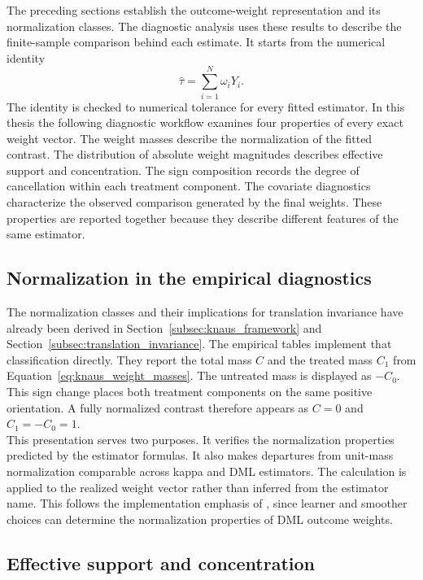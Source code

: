 \documentclass[12pt, a4paper, oneside]{article}
\theoremstyle{plain}
\theoremstyle{definition}
\begin{document}
The preceding sections establish the outcome-weight representation and its
normalization classes. The diagnostic analysis uses these results to describe the
finite-sample comparison behind each estimate. It starts from the numerical identity
\begin{equation}
    \widehat\tau=\sum_{i=1}^{N}\omega_iY_i.
    \label{eq:diagnostic_identity}
\end{equation}
The identity is checked to numerical tolerance for every fitted estimator. 
In this thesis the following diagnostic workflow examines four properties of every exact weight vector. The
weight masses describe the normalization of the fitted contrast. The distribution of
absolute weight magnitudes describes effective support and concentration. The sign
composition records the degree of cancellation within each treatment component. The
covariate diagnostics characterize the observed comparison generated by the final
weights. These properties are reported together because they describe different
features of the same estimator.


\subsection{Normalization in the empirical diagnostics}

The normalization classes and their implications for translation invariance have
already been derived in Section~\ref{subsec:knaus_framework} and
Section~\ref{subsec:translation_invariance}. The empirical tables implement that
classification directly. They report the total mass \(C\) and the treated mass
\(C_1\) from Equation~\eqref{eq:knaus_weight_masses}. The untreated mass is displayed
as \(-C_0\). This sign change places both treatment components on the same positive
orientation. A fully normalized contrast therefore appears as \(C=0\) and
\(C_1=-C_0=1\).\\
This presentation serves two purposes. It verifies the normalization properties
predicted by the estimator formulas. It also makes departures from unit-mass
normalization comparable across kappa and DML estimators. The calculation is applied
to the realized weight vector rather than inferred from the estimator name. This
follows the implementation emphasis of \citet{knaus2024treatment}, since learner and
smoother choices can determine the normalization properties of DML outcome weights.
\subsection{Effective support and concentration}
\label{subsec:effective_support}
\end{document}
